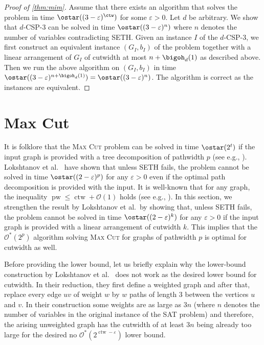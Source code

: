 \documentclass[a4paper,UKenglish,cleveref, autoref, thm-restate]{lipics-v2021}
\begin{document}
\begin{proof}[Proof of \cref{thm:mim}]
Assume that there exists an algorithm that solves the \Mimp problem in time $\ostar((3-\varepsilon)^{\ctw})$ for some $\varepsilon > 0$. 
Let $d$ be arbitrary.
We show that $d$-CSP-$3$ can be solved in time $\ostar((3-\varepsilon)^n)$ where $n$ denotes the number of variables contradicting SETH.
Given an instance $I$ of the $d$-CSP-$3$, 
we first construct an equivalent instance $(G_I, b_I)$ of the \Mimp problem together with a linear arrangement of $G_I$ of cutwidth at most $n+\bigoh_d(1)$ as described above. 
Then we run the above algorithm on $(G_I, b_I)$ in time $\ostar((3-\varepsilon)^{n+\bigoh_d(1)}) = \ostar((3-\varepsilon)^{n})$. 
The algorithm is correct as the instances are equivalent.
\end{proof}

 
\section{Max Cut}\label{sec:maxcut}

It is folklore that the \textsc{Max Cut} problem can be solved in time $\ostar(2^t)$ if the input graph is provided with a tree 
decomposition of pathwidth $p$ (see e.g., \cite{DBLP:books/sp/CyganFKLMPPS15}).
Lokshtanov et al.~\cite{DBLP:journals/talg/LokshtanovMS18} have shown that unless SETH fails, the problem cannot be solved in time $\ostar((2 - \varepsilon)^p)$ for any $\varepsilon > 0$ even if the optimal path decomposition is provided with the input.
It is well-known that for any graph, the inequality $\operatorname{pw} \leq \operatorname{ctw} + \mathcal{O}(1)$ holds (see e.g., \cite{DBLP:journals/tcs/Bodlaender98}).
In this section, we strengthen the result by Lokshtanov et al.\ by showing that, unless SETH fails, the problem cannot be solved in time $\ostar((2 - \varepsilon)^k)$ for any $\varepsilon > 0$ if the input graph is provided with a linear arrangement of cutwidth $k$.
This implies that the $\mathcal{O}^*(2^p)$ algorithm solving \textsc{Max Cut} for graphs of pathwidth $p$ is optimal for cutwidth as well.

Before providing the lower bound, let us briefly explain why the lower-bound construction by Lokshtanov et al.~\cite{DBLP:journals/talg/LokshtanovMS18} does not work as the desired lower bound for cutwidth.
In their reduction, they first define a weighted graph and after that, replace every edge $uv$ of weight $w$ by $w$ paths of length 3 between the vertices $u$ and $v$.
In their construction some weights are as large as $3n$ (where $n$ denotes the number of variables in the original instance of the SAT problem) and therefore, the arising unweighted graph has the cutwidth of at least $3n$ being already too large for the desired no $\mathcal{O}^*(2^{\operatorname{ctw} - \varepsilon})$ lower bound.
\end{document}
